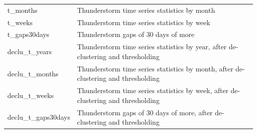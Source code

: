 \documentclass[12pt,oneside]{reedthesis}
\begin{document}
\begin{longtable}[t]{>{\raggedright\arraybackslash}p{1.2in}>{\raggedright\arraybackslash}p{4.6in}}
t\_months & Thunderstorm time series statistics by month\\
t\_weeks & Thunderstorm time series statistics by week\\
t\_gaps30days & Thunderstorm gaps of 30 days of more\\
declu\_t\_years & Thunderstorm time series statistics by year, after de-clustering and thresholding\\
declu\_t\_months & Thunderstorm time series statistics by month, after de-clustering and thresholding\\
declu\_t\_weeks & Thunderstorm time series statistics by week, after de-clustering and thresholding\\
declu\_t\_gaps30days & Thunderstorm gaps of 30 days of more,  after de-clustering and thresholding\\
\bottomrule
\end{longtable}
\endgroup{}
\end{document}
